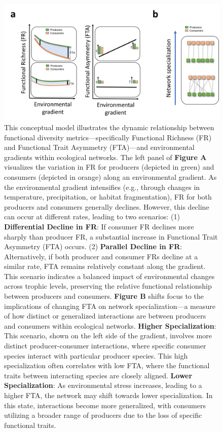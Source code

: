 \documentclass[
]{agujournal2019}
\begin{document}
\begin{figure}[H]

{\centering \includegraphics{Main_figures/00_Figure1.png}

}

\caption{This conceptual model illustrates the dynamic relationship
between functional diversity metrics---specifically Functional Richness
(FR) and Functional Trait Asymmetry (FTA)---and environmental gradients
within ecological networks. The left panel of \textbf{Figure A}
visualizes the variation in FR for producers (depicted in green) and
consumers (depicted in orange) along an environmental gradient. As the
environmental gradient intensifies (e.g., through changes in
temperature, precipitation, or habitat fragmentation), FR for both
producers and consumers generally declines. However, this decline can
occur at different rates, leading to two scenarios: (1)
\textbf{Differential Decline in FR}: If consumer FR declines more
sharply than producer FR, a substantial increase in Functional Trait
Asymmetry (FTA) occurs. (2) \textbf{Parallel Decline in FR}:
Alternatively, if both producer and consumer FRs decline at a similar
rate, FTA remains relatively constant along the gradient. This scenario
indicates a balanced impact of environmental changes across trophic
levels, preserving the relative functional relationship between
producers and consumers. \textbf{Figure B} shifts focus to the
implications of changing FTA on network specialization---a measure of
how distinct or generalized interactions are between producers and
consumers within ecological networks. \textbf{Higher Specialization}:
This scenario, shown on the left side of the gradient, involves more
distinct producer-consumer interactions, where specific consumer species
interact with particular producer species. This high specialization
often correlates with low FTA, where the functional traits between
interacting species are closely aligned. \textbf{Lower Specialization}:
As environmental stress increases, leading to a higher FTA, the network
may shift towards lower specialization. In this state, interactions
become more generalized, with consumers utilizing a broader range of
producers due to the loss of specific functional traits.}

\end{figure}%
\end{document}
